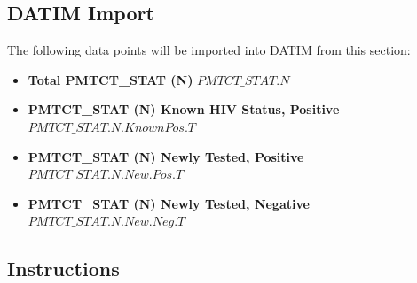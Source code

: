 \documentclass[
  openany]{book}
\begin{document}
\hypertarget{datim-import-16}{%
\subsection{DATIM Import}\label{datim-import-16}}

The following data points will be imported into DATIM from this section:

\begin{itemize}
\item
  \textbf{Total PMTCT\_STAT (N)} \(PMTCT\_STAT.N\)
\item
  \textbf{PMTCT\_STAT (N) Known HIV Status, Positive}
  \(PMTCT\_STAT.N.KnownPos.T\)
\item
  \textbf{PMTCT\_STAT (N) Newly Tested, Positive} \(PMTCT\_STAT.N.New.Pos.T\)
\item
  \textbf{PMTCT\_STAT (N) Newly Tested, Negative} \(PMTCT\_STAT.N.New.Neg.T\)
\end{itemize}

\hypertarget{instructions-16}{%
\subsection{Instructions}\label{instructions-16}}
\end{document}
